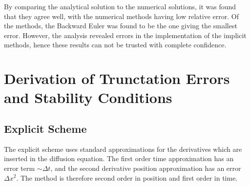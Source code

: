 \documentclass[aps,reprint]{revtex4-1}
\newcommand\blankpage{%
  \null
  \thispagestyle{empty}%
  \addtocounter{page}{-1}%
  \newpage}
\begin{document}
By comparing the analytical solution to the numerical solutions, it was found
that they agree well, with the numerical methods having low relative error. Of
the methods, the Backward Euler was found to be the one giving the smallest
error. However, the analysis revealed errors in the implementation of the
implicit methods, hence these results can not be trusted with complete confidence.

\blankpage
\appendix
\section{Derivation of Trunctation Errors and Stability Conditions} \label{sec:errors}
\subsection{Explicit Scheme}
The explicit scheme uses standard approximations for the derivatives which are
inserted in the diffusion equation. The first order time approximation has
an error term $\sim \Delta{t}$, and the second derivative position approximation
has an error $\Delta{x^2}$. The method is therefore second order in position and
first order in time.
\end{document}
